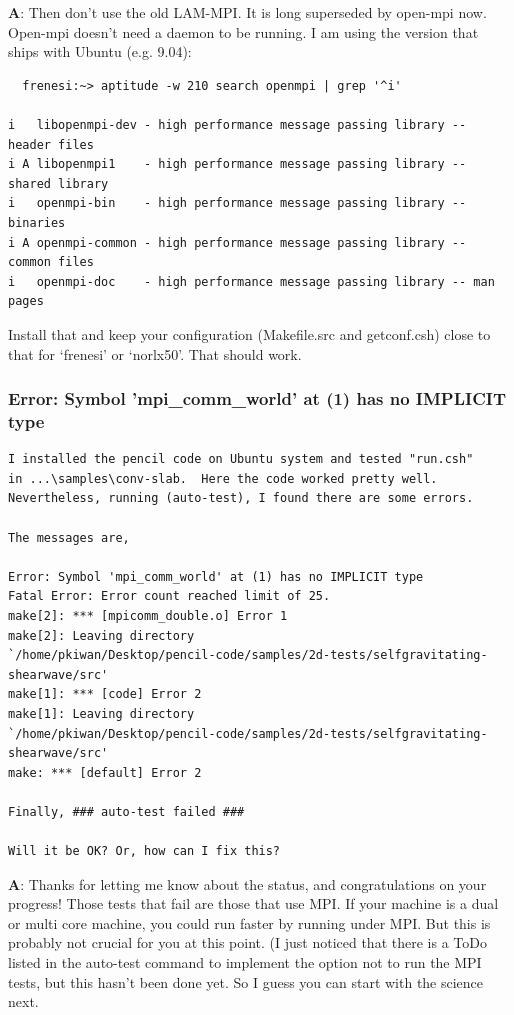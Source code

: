 \documentclass[\mydriver,12pt,twoside,notitlepage,a4paper]{article}
\begin{document}
{\bf A}: Then don't use the old LAM-MPI. It is long superseded by open-mpi now.
Open-mpi doesn't need a daemon to be running. I am using the version that
ships with Ubuntu (e.g. 9.04):

\begin{Verbatim}
  frenesi:~> aptitude -w 210 search openmpi | grep '^i'

i   libopenmpi-dev - high performance message passing library -- header files
i A libopenmpi1    - high performance message passing library -- shared library
i   openmpi-bin    - high performance message passing library -- binaries
i A openmpi-common - high performance message passing library -- common files
i   openmpi-doc    - high performance message passing library -- man pages
\end{Verbatim}

Install that and keep your configuration (Makefile.src and getconf.csh)
close to that for `frenesi' or `norlx50'. That should work.

\subsubsection{Error: Symbol 'mpi_comm_world' at (1) has no IMPLICIT type}

\begin{Verbatim}
I installed the pencil code on Ubuntu system and tested "run.csh"
in ...\samples\conv-slab.  Here the code worked pretty well.
Nevertheless, running (auto-test), I found there are some errors.

The messages are,

Error: Symbol 'mpi_comm_world' at (1) has no IMPLICIT type
Fatal Error: Error count reached limit of 25.
make[2]: *** [mpicomm_double.o] Error 1
make[2]: Leaving directory
`/home/pkiwan/Desktop/pencil-code/samples/2d-tests/selfgravitating-shearwave/src'
make[1]: *** [code] Error 2
make[1]: Leaving directory
`/home/pkiwan/Desktop/pencil-code/samples/2d-tests/selfgravitating-shearwave/src'
make: *** [default] Error 2

Finally, ### auto-test failed ###

Will it be OK? Or, how can I fix this?
\end{Verbatim}

\medskip

{\bf A}: Thanks for letting me know about the status, and congratulations
on your progress! Those tests that fail are those that use MPI.
If your machine is a dual or multi core machine, you could run
faster by running under MPI. But this is probably not crucial for
you at this point. (I just noticed that there is a ToDo listed
in the auto-test command to implement the option not to run the
MPI tests, but this hasn't been done yet. So I guess you can start
with the science next.
\end{document}
